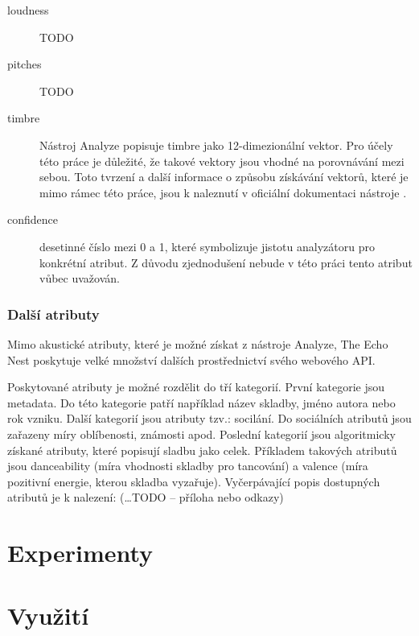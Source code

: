 \documentclass[thesis=M,czech]{FITthesis}[2012/06/26]
\begin{document}
\begin{description}
\item[loudness] TODO
\item[pitches]  TODO
\item[timbre] Nástroj Analyze popisuje timbre jako 12-dimezionální vektor. Pro účely této práce je důležité, že takové vektory jsou vhodné na porovnávání mezi sebou. Toto tvrzení a další informace o způsobu získávání vektorů, které je mimo rámec této práce, jsou k naleznutí v oficiální dokumentaci nástroje \cite{analyze}.
\item[confidence] desetinné číslo mezi 0 a 1, které symbolizuje jistotu analyzátoru pro konkrétní atribut. Z důvodu zjednodušení nebude v této práci tento atribut vůbec uvažován.
\end{description}

\subsection{Další atributy}
Mimo akustické atributy, které je možné získat z nástroje Analyze, The Echo Nest poskytuje velké množství dalších prostřednictví svého webového API.

Poskytované atributy je možné rozdělit do tří kategorií. První kategorie jsou metadata. Do této kategorie patří například název skladby, jméno autora nebo rok vzniku. Další kategorií jsou atributy tzv.: socilání. Do sociálních atributů jsou zařazeny míry oblíbenosti, známosti apod. Poslední kategorií jsou algoritmicky získané atributy, které popisují sladbu jako celek. Příkladem takových atributů jsou danceability (míra vhodnosti skladby pro tancování) a valence (míra pozitivní energie, kterou skladba vyzařuje). Vyčerpávající popis dostupných atributů je k nalezení: (\dots TODO -- příloha nebo odkazy)


\chapter{Experimenty}


\chapter{Využití}
\end{document}
